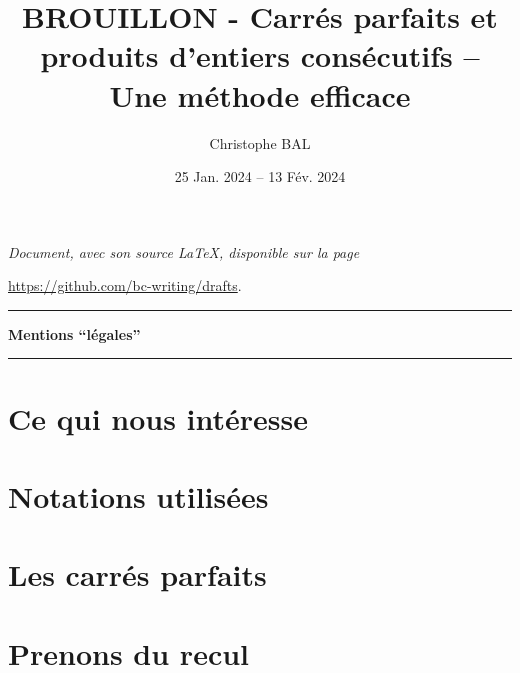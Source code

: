 \documentclass[12pt]{amsart}
\newcommand\contentdir{\jobname}
\begin{document}
\title{BROUILLON - Carrés parfaits et produits d'entiers consécutifs -- Une méthode efficace}
\author{Christophe BAL}
\date{25 Jan. 2024 -- 13 Fév. 2024}

\maketitle

\begin{center}
	\itshape
	Document, avec son source \LaTeX, disponible sur la page
	
	\url{https://github.com/bc-writing/drafts}.
\end{center}


\bigskip


\begin{center}
	\hrule\vspace{.3em}
	{
		\fontsize{1.35em}{1em}\selectfont
		\textbf{Mentions \enquote{légales}}
	}
			
	\vspace{0.45em}
	\small
	\doclicenseThis
	\hrule
\end{center}


\setcounter{tocdepth}{2}
\tableofcontents




\newpage
\section{Ce qui nous intéresse}






\section{Notations utilisées}






\section{Les carrés parfaits}







\newpage
\section{Prenons du recul}
\end{document}
